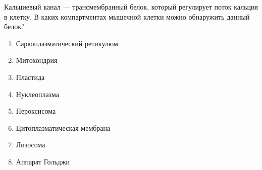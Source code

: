 
Кальциевый канал — трансмембранный белок, который регулирует поток кальция в клетку. В каких
компартментах мышечной клетки можно обнаружить данный белок?

\begin{enumerate}
    \item Саркоплазматический ретикулюм
    \item Митохондрия
    \item Пластида
    \item Нуклеоплазма 
    \item Пероксисома
    \item Цитоплазматическая мембрана
    \item Лизосома
    \item Аппарат Гольджи
\end{enumerate}

\explanationSection

